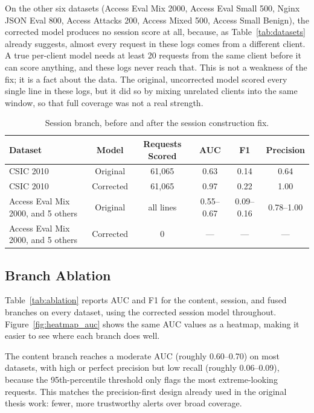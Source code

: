 \documentclass[futureinternet,article,accept,moreauthors]{Definitions/mdpi}
\begin{document}
On the other six datasets (Access Eval Mix 2000, Access Eval Small 500, Nginx JSON Eval 800, Access Attacks 200, Access Mixed 500, Access Small Benign), the corrected model produces no session score at all, because, as Table~\ref{tab:datasets} already suggests, almost every request in these logs comes from a different client. A true per-client model needs at least 20 requests from the same client before it can score anything, and these logs never reach that. This is not a weakness of the fix; it is a fact about the data. The original, uncorrected model scored every single line in these logs, but it did so by mixing unrelated clients into the same window, so that full coverage was not a real strength.

\begin{table}[H]
\caption{Session branch, before and after the session construction fix.}
\label{tab:session_fix}
\begin{tabularx}{\textwidth}{lCCCCC}
\toprule
\textbf{Dataset} & \textbf{Model} & \textbf{Requests Scored} & \textbf{AUC} & \textbf{F1} & \textbf{Precision} \\
\midrule
CSIC 2010 & Original & 61{,}065 & 0.63 & 0.14 & 0.64 \\
CSIC 2010 & Corrected & 61{,}065 & 0.97 & 0.22 & 1.00 \\
Access Eval Mix 2000, and 5 others & Original & all lines & 0.55--0.67 & 0.09--0.16 & 0.78--1.00 \\
Access Eval Mix 2000, and 5 others & Corrected & 0 & --- & --- & --- \\
\bottomrule
\end{tabularx}
\end{table}

\subsection{Branch Ablation}

Table~\ref{tab:ablation} reports AUC and F1 for the content, session, and fused branches on every dataset, using the corrected session model throughout. Figure~\ref{fig:heatmap_auc} shows the same AUC values as a heatmap, making it easier to see where each branch does well.

The content branch reaches a moderate AUC (roughly 0.60--0.70) on most datasets, with high or perfect precision but low recall (roughly 0.06--0.09), because the 95th-percentile threshold only flags the most extreme-looking requests. This matches the precision-first design already used in the original thesis work: fewer, more trustworthy alerts over broad coverage.
\end{document}

